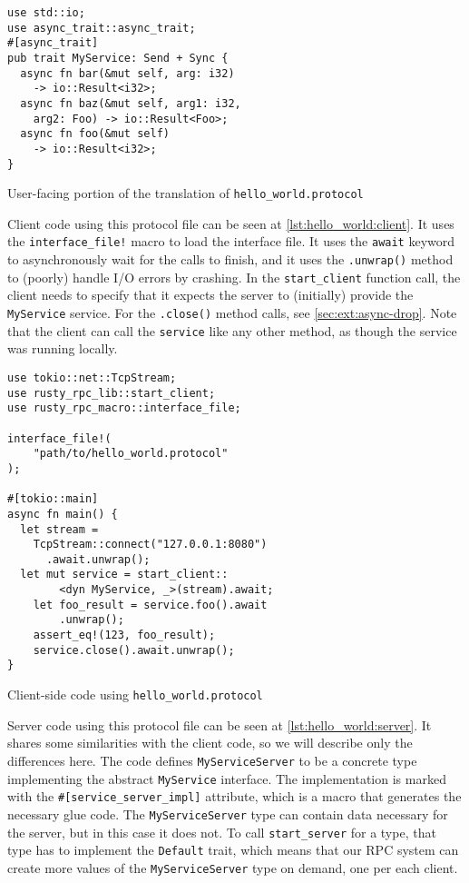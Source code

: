 \documentclass[11pt, twocolumn]{article}
\begin{document}
\begin{listing}
\begin{verbatim}
use std::io;
use async_trait::async_trait;
#[async_trait]
pub trait MyService: Send + Sync {
  async fn bar(&mut self, arg: i32)
    -> io::Result<i32>;
  async fn baz(&mut self, arg1: i32,
    arg2: Foo) -> io::Result<Foo>;
  async fn foo(&mut self)
    -> io::Result<i32>;
}
\end{verbatim}
\caption{User-facing portion of the translation of \texttt{hello\_world.protocol}}
\label{lst:hello_world:translation}
\end{listing}

Client code using this protocol file can be seen at \cref{lst:hello_world:client}. It uses the \texttt{interface\_file!} macro to load the interface file. It uses the \texttt{await} keyword to asynchronously wait for the calls to finish, and it uses the \texttt{.unwrap()} method to (poorly) handle I/O errors by crashing. In the \texttt{start\_client} function call, the client needs to specify that it expects the server to (initially) provide the \texttt{MyService} service. For the \texttt{.close()} method calls, see \cref{sec:ext:async-drop}. Note that the client can call the \texttt{service} like any other method, as though the service was running locally.

\begin{listing}
\begin{verbatim}
use tokio::net::TcpStream;
use rusty_rpc_lib::start_client;
use rusty_rpc_macro::interface_file;

interface_file!(
    "path/to/hello_world.protocol"
);

#[tokio::main]
async fn main() {
  let stream =
    TcpStream::connect("127.0.0.1:8080")
      .await.unwrap();
  let mut service = start_client::
        <dyn MyService, _>(stream).await;
    let foo_result = service.foo().await
        .unwrap();
    assert_eq!(123, foo_result);
    service.close().await.unwrap();
}
\end{verbatim}
\caption{Client-side code using \texttt{hello\_world.protocol}}
\label{lst:hello_world:client}
\end{listing}

Server code using this protocol file can be seen at \cref{lst:hello_world:server}. It shares some similarities with the client code, so we will describe only the differences here. The code defines \texttt{MyServiceServer} to be a concrete type implementing the abstract \texttt{MyService} interface. The implementation is marked with the \texttt{\#[service\_server\_impl]} attribute, which is a macro that generates the necessary glue code. The \texttt{MyServiceServer} type can contain data necessary for the server, but in this case it does not. To call \texttt{start\_server} for a type, that type has to implement the \texttt{Default} trait, which means that our RPC system can create more values of the \texttt{MyServiceServer} type on demand, one per each client.
\end{document}
